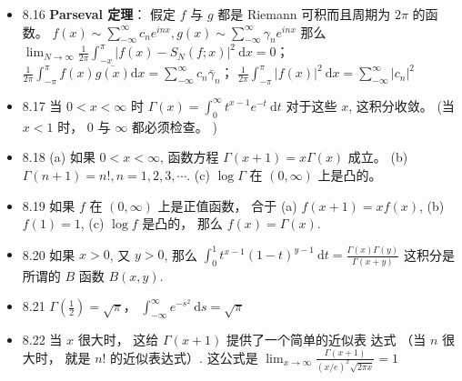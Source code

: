 \begin{itemize}
\item 8.16 \textbf{Parseval 定理}： 假定 $f$ 与 $g$ 都是 Riemann 可积而且周期为 $2 \pi$ 的函数。 $f(x) \sim \sum_{-\infty}^{\infty} c_{n} e^{i n x}, g(x) \sim \sum_{-\infty}^{\infty} \gamma_{n} e^{i n x}$ 那么 $\lim _{N \rightarrow \infty} \frac{1}{2 \pi} \int_{-x}^{\pi}\left|f(x)-S_{N}(f ; x)\right|^{2} \mathrm{~d} x=0$； $\frac{1}{2 \pi} \int_{-\pi}^{\pi} f(x) \overline{g(x)} \mathrm{d} x=\sum_{-\infty}^{\infty} c_{n} \bar{\gamma}_{n}$； $\frac{1}{2 \pi} \int_{-\pi}^{\pi}|f(x)|^{2} \mathrm{~d} x=\sum_{-\infty}^{\infty}\left|c_{n}\right|^{2}$

\item 8.17 当 $0<x<\infty$ 时 $\Gamma(x)=\int_{0}^{\infty} t^{x-1} e^{-t} \mathrm{~d} t$ 对于这些 $x$, 这积分收敛。 (当 $x<1$ 时， 0 与 $\infty$ 都必须检查。 )

\item 8.18 (a) 如果 $0<x<\infty$, 函数方程 $\Gamma(x+1)=x \Gamma(x)$ 成立。 (b) $\Gamma(n+1)=n !, n=1,2,3, \cdots$. (c) $\log \Gamma$ 在 $(0, \infty)$ 上是凸的。

\item 8.19 如果 $f$ 在 $(0, \infty)$ 上是正值函数， 合于 (a) $f(x+1)=x f(x)$, (b) $f(1)=1$, (c) $\log f$ 是凸的， 那么 $f(x)=\Gamma(x)$.

\item 8.20 如果 $x>0$, 又 $y>0$, 那么 $\int_{0}^{1} t^{x-1}(1-t)^{y-1} \mathrm{~d} t=\frac{\Gamma(x) \Gamma(y)}{\Gamma(x+y)}$ 这积分是所谓的 $B$ 函数 $B(x, y)$.

\item 8.21 $\Gamma\left(\frac{1}{2}\right)=\sqrt{\pi}$， $\int_{-\infty}^{\infty} e^{-s^{2}} \mathrm{~d} s=\sqrt{\pi}$

\item 8.22 当 $x$ 很大时， 这给 $\Gamma(x+1)$ 提供了一个简单的近似表 达式 （当 $n$ 很大时， 就是 $n !$ 的近似表达式）. 这公式是 $\lim _{x \rightarrow \infty} \frac{\Gamma(x+1)}{(x / e)^{x} \sqrt{2 \pi x}}=1$
\end{itemize}
